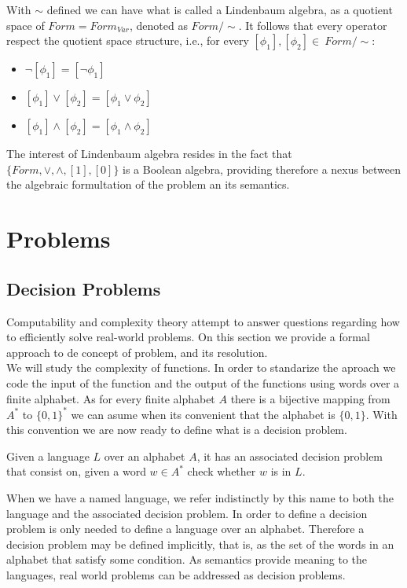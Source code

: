 \begin{definition}
With $\sim$ defined we can have what is called a Lindenbaum algebra, as a quotient space of $Form = Form_{Var}$, denoted as $Form/\sim$. It follows that every operator respect the quotient space structure, i.e., for every $[\phi_1],[\phi_2]\in\ Form/\sim$:

\begin{itemize}
\item $\neg [\phi_1] = [\neg\phi_1]$
\item $ [\phi_1] \vee [\phi_2]= [\phi_1 \vee \phi_2]$
\item $ [\phi_1] \wedge [\phi_2]= [\phi_1 \wedge \phi_2]$
\end{itemize}

The interest of Lindenbaum algebra resides in the fact that $\{Form, \vee,\wedge,[1],[0]\}$ is a Boolean algebra, providing therefore a nexus between the algebraic formultation of the problem an its semantics.


\section{Problems}

\subsection{Decision Problems}
Computability and complexity theory attempt to answer questions regarding how to efficiently solve real-world problems. On this section we provide a formal approach to de concept of problem, and its resolution.\\

We will study the complexity of functions. In order to standarize the aproach we code the input of the function and the output of the functions using words over a finite alphabet. As for every finite alphabet $A$ there is a bijective mapping from $A^*$ to $\{0,1\}^*$ we can asume when its convenient that the alphabet is $\{0,1\}$. With this convention we are now ready to define what is a decision problem.

\begin{definition}
Given a language $L$ over an alphabet $A$, it has an associated decision problem that consist on, given a word $w\in A^*$ check whether $w$ is in $L$. 	
\end{definition}


When we have a named language, we refer indistinctly by this name to both the language and the associated decision problem. In order to define a decision problem is only needed to define a language over an alphabet. Therefore a decision problem may be defined implicitly, that is, as the set of the words in an alphabet that satisfy some condition. As semantics provide meaning to the languages, real world problems can be addressed as decision problems.


\end{definition}
